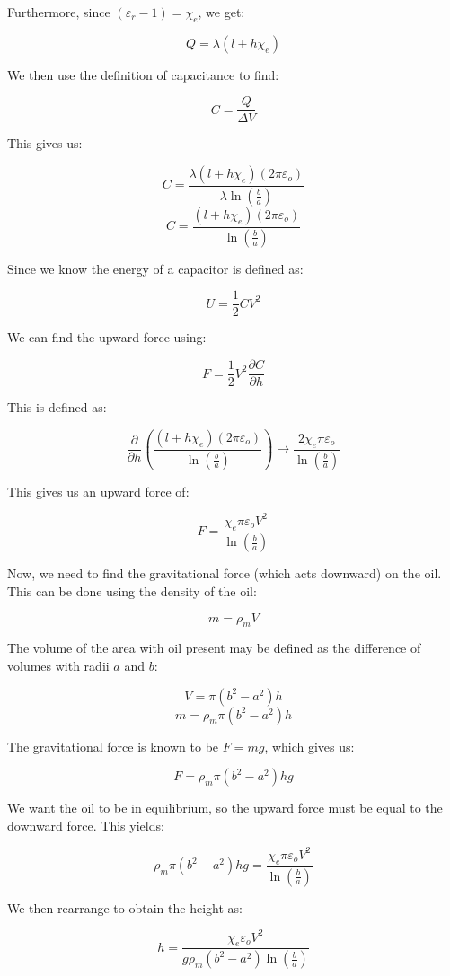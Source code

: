 \begin{enumerate}
    Furthermore, since $(\varepsilon_r-1)=\chi_e$, we get:

    $$Q=\lambda (l+h\chi_e)$$

    We then use the definition of capacitance to find:

    $$C=\frac{Q}{\Delta V}$$

    This gives us:

    $$C=\frac{\lambda(l+h\chi_e)(2\pi\varepsilon_o)}{\lambda\ln\left( \frac{b}{a} \right)}$$
    $$C=\frac{(l+h\chi_e)(2\pi\varepsilon_o)}{\ln\left( \frac{b}{a} \right)}$$

    Since we know the energy of a capacitor is defined as:

    $$U=\frac{1}{2}CV^2$$

    We can find the upward force using:

    $$F=\frac{1}{2}V^2\frac{\partial C}{\partial h}$$

    This is defined as:

    $$\frac{\partial}{\partial h}\left( \frac{(l+h\chi_e)(2\pi\varepsilon_o)}{\ln\left( \frac{b}{a} \right)} \right)\to\frac{2\chi_e\pi\varepsilon_o}{\ln\left( \frac{b}{a} \right)}$$

    This gives us an upward force of:

    $$F=\frac{\chi_e\pi\varepsilon_oV^2}{\ln\left( \frac{b}{a} \right)}$$

    Now, we need to find the gravitational force (which acts downward) on the oil. This can be done using the density of the oil:

    $$m=\rho_mV$$

    The volume of the area with oil present may be defined as the difference of volumes with radii $a$ and $b$:

    $$V=\pi(b^2-a^2)h$$
    $$m=\rho_m\pi\left( b^2-a^2 \right)h$$

    The gravitational force is known to be $F=mg$, which gives us:

    $$F=\rho_m\pi\left( b^2-a^2 \right)hg$$

    We want the oil to be in equilibrium, so the upward force must be equal to the downward force. This yields:

    $$\rho_m\pi\left( b^2-a^2 \right)hg=\frac{\chi_e\pi\varepsilon_oV^2}{\ln\left( \frac{b}{a} \right)}$$

    We then rearrange to obtain the height as:

    $$\boxed{h=\frac{\chi_e\varepsilon_o V^2}{g\rho_m(b^2-a^2)\ln\left( \frac{b}{a} \right)}}$$


\end{enumerate}
